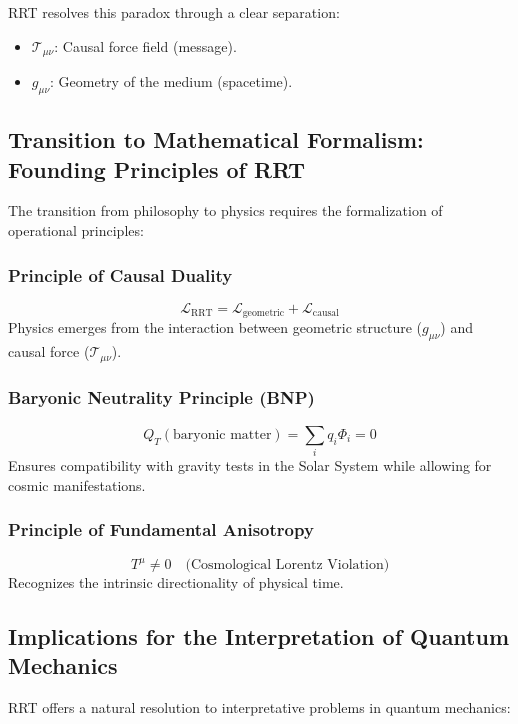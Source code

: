 \documentclass[12pt,a4paper]{article}
\begin{document}
RRT resolves this paradox through a clear separation:
\begin{itemize}
    \item $\mathcal{T}_{\mu\nu}$: Causal force field (message).
    \item $g_{\mu\nu}$: Geometry of the medium (spacetime).
\end{itemize}



\subsection{Transition to Mathematical Formalism: Founding Principles of RRT}
The transition from philosophy to physics requires the formalization of operational principles:

\subsubsection{Principle of Causal Duality}
\begin{equation}
    \mathcal{L}_{\text{RRT}} = \mathcal{L}_{\text{geometric}} + \mathcal{L}_{\text{causal}}
\end{equation}
Physics emerges from the interaction between geometric structure ($g_{\mu\nu}$) and causal force ($\mathcal{T}_{\mu\nu}$).

\subsubsection{Baryonic Neutrality Principle (BNP)}
\begin{equation}
    Q_T(\text{baryonic matter}) = \sum_i q_i \Phi_i = 0
\end{equation}
Ensures compatibility with gravity tests in the Solar System while allowing for cosmic manifestations.

\subsubsection{Principle of Fundamental Anisotropy}
\begin{equation}
    T^\mu \neq 0 \quad \text{(Cosmological Lorentz Violation)}
\end{equation}
Recognizes the intrinsic directionality of physical time.

\subsection{Implications for the Interpretation of Quantum Mechanics}
RRT offers a natural resolution to interpretative problems in quantum mechanics:
\end{document}
